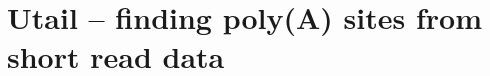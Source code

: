 \documentclass[]{ntnuthesis}
\begin{document}


%

%


%


\appendix
\chapter{Utail -- finding poly(A) sites from short read data}


\printbibliography
\end{document}
